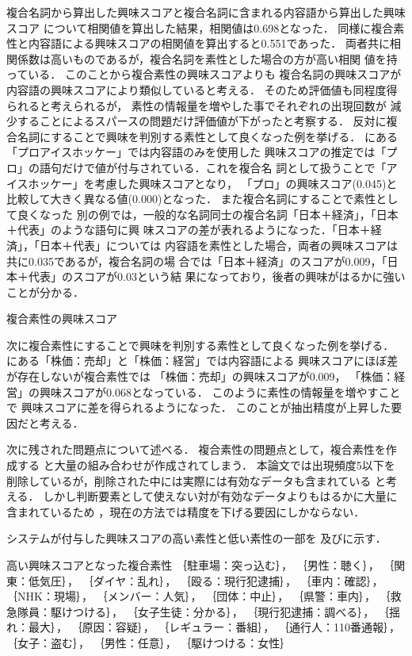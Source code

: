 \documentclass[japanese]{jnlp_1.4}
\newcounter{ex}
\def\ex#1{}
\def\exref#1{}
\def\tableref#1{}
\begin{document}
複合名詞から算出した興味スコアと複合名詞に含まれる内容語から算出した興味スコア
について相関値を算出した結果，相関値は0.698となった．
同様に複合素性と内容語による興味スコアの相関値を算出すると0.551であった．
両者共に相関係数は高いものであるが，複合名詞を素性とした場合の方が高い相関
値を持っている．
このことから複合素性の興味スコアよりも
複合名詞の興味スコアが内容語の興味スコアにより類似していると考える．
そのため評価値も同程度得られると考えられるが，
素性の情報量を増やした事でそれぞれの出現回数が
減少することによるスパースの問題だけ評価値が下がったと考察する．
反対に複合名詞にすることで興味を判別する素性として良くなった例を挙げる．
\tableref{fukugoures}にある「プロアイスホッケー」では内容語のみを使用した
興味スコアの推定では「プロ」の語句だけで値が付与されている．これを複合名
詞として扱うことで「アイスホッケー」を考慮した興味スコアとなり，
「プロ」の興味スコア(0.045)と比較して大きく異なる値(0.000)となった．
また複合名詞にすることで素性として良くなった
別の例では，一般的な名詞同士の複合名詞「日本＋経済」，「日本＋代表」のような語句に興
味スコアの差が表れるようになった．「日本＋経済」，「日本＋代表」については
内容語を素性とした場合，両者の興味スコアは共に0.035であるが，複合名詞の場
合では「日本＋経済」のスコアが0.009，「日本＋代表」のスコアが0.03という結
果になっており，後者の興味がはるかに強いことが分かる．

\begin{table}[t]
\caption{複合素性の興味スコア}

\label{tapleres}
\end{table}

次に複合素性にすることで興味を判別する素性として良くなった例を挙げる．
\tableref{tapleres}にある「株価：売却」と「株価：経営」では内容語による
興味スコアにほぼ差が存在しないが複合素性では
「株価：売却」の興味スコアが0.009，
「株価：経営」の興味スコアが0.068となっている．
このように素性の情報量を増やすことで
興味スコアに差を得られるようになった．
このことが抽出精度が上昇した要因だと考える．

次に残された問題点について述べる．
複合素性の問題点として，複合素性を作成する
と大量の組み合わせが作成されてしまう．
本論文では出現頻度5以下を削除しているが，削除された中には実際には有効なデータも含まれている
と考える．
しかし判断要素として使えない対が有効なデータよりもはるかに大量に含まれているため
，現在の方法では精度を下げる要因にしかならない．


システムが付与した興味スコアの高い素性と低い素性の一部を
\exref{high}及び\exref{low}に示す．
\begin{itembox}{\ex{}\label{high}高い興味スコアとなった複合素性}
｛駐車場：突っ込む｝，
｛男性：聴く｝，
｛関東：低気圧｝，
｛ダイヤ：乱れ｝，
｛殴る：現行犯逮捕｝，
｛車内：確認｝，
｛NHK：現場｝，
｛メンバー：人気｝，
｛団体：中止｝，
｛県警：車内｝，
｛救急隊員：駆けつける｝，
｛女子生徒：分かる｝，
｛現行犯逮捕：調べる｝，
｛揺れ：最大｝，
｛原因：容疑｝，
｛レギュラー：番組｝，
｛通行人：110番通報｝，
｛女子：盗む｝，
｛男性：任意｝，
｛駆けつける：女性｝
\end{itembox}
\end{document}
